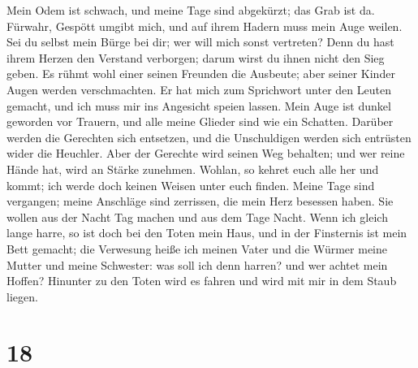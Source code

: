  Mein Odem ist schwach, und meine Tage sind abgekürzt; das
Grab ist da.  Fürwahr, Gespött umgibt mich, und auf ihrem
Hadern muss mein Auge weilen.  Sei du selbst mein Bürge
bei dir; wer will mich sonst vertreten?  Denn du hast
ihrem Herzen den Verstand verborgen; darum wirst du ihnen nicht den Sieg
geben.  Es rühmt wohl einer seinen Freunden die Ausbeute;
aber seiner Kinder Augen werden verschmachten.  Er hat
mich zum Sprichwort unter den Leuten gemacht, und ich muss mir ins
Angesicht speien lassen.  Mein Auge ist dunkel geworden
vor Trauern, und alle meine Glieder sind wie ein Schatten.
 Darüber werden die Gerechten sich entsetzen, und die
Unschuldigen werden sich entrüsten wider die Heuchler. 
Aber der Gerechte wird seinen Weg behalten; und wer reine Hände hat,
wird an Stärke zunehmen.  Wohlan, so kehret euch alle her
und kommt; ich werde doch keinen Weisen unter euch finden.
 Meine Tage sind vergangen; meine Anschläge sind
zerrissen, die mein Herz besessen haben.  Sie wollen aus
der Nacht Tag machen und aus dem Tage Nacht.  Wenn ich
gleich lange harre, so ist doch bei den Toten mein Haus, und in der
Finsternis ist mein Bett gemacht;  die Verwesung heiße
ich meinen Vater und die Würmer meine Mutter und meine Schwester:
 was soll ich denn harren? und wer achtet mein Hoffen?
 Hinunter zu den Toten wird es fahren und wird mit mir in
dem Staub liegen.

\hypertarget{section-17}{%
\section{18}\label{section-17}}

